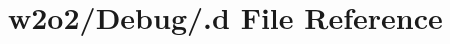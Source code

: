 \hypertarget{w2o2_2_debug_2_8d}{}\section{w2o2/\+Debug/.d File Reference}
\label{w2o2_2_debug_2_8d}
